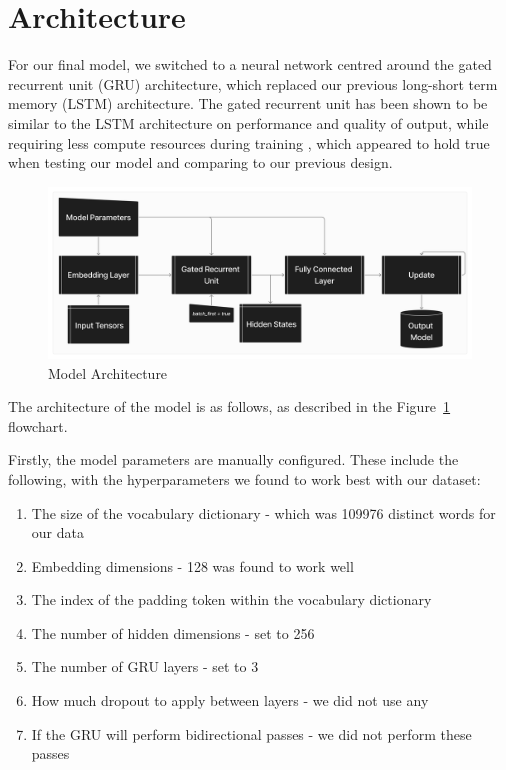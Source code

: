 \documentclass{article} %
\begin{document}
\section{Architecture}

For our final model, we switched to a neural network centred around the gated recurrent unit (GRU) architecture, which replaced our previous long-short term memory (LSTM) architecture. 
The gated recurrent unit has been shown to be similar to the LSTM architecture on performance and quality of output, while requiring less compute resources during training \citep{LSTMvGRU}, which
appeared to hold true when testing our model and comparing to our previous design. 


\begin{figure}[h]
  \begin{center}
  \includegraphics[width=1\textwidth]{Figs/Haiku-Generation.png}
  \end{center}
  \caption{Model Architecture}
  \label{fig:flowchart}
\end{figure}

The architecture of the model is as follows, as described in the Figure~\ref{fig:flowchart} flowchart.

Firstly, the model parameters are manually configured. These include the following, with the hyperparameters we found to work best with our dataset:

\begin{enumerate}
  \item The size of the vocabulary dictionary - which was 109976 distinct words for our data
  \item Embedding dimensions - 128 was found to work well
  \item The index of the padding token within the vocabulary dictionary
  \item The number of hidden dimensions - set to 256
  \item The number of GRU layers - set to 3
  \item How much dropout to apply between layers - we did not use any
  \item If the GRU will perform bidirectional passes - we did not perform these passes
\end{enumerate}
\end{document}
